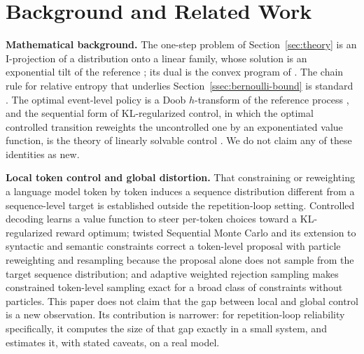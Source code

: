 \documentclass[11pt]{article}
\begin{document}
\section{Background and Related Work}
\label{sec:related}

\textbf{Mathematical background.} The one-step problem of Section~\ref{sec:theory} is an I-projection of a distribution onto a linear family, whose solution is an exponential tilt of the reference \citep{csiszar1975idivergence}; its dual is the convex program of \citet{boyd2004convex}. The chain rule for relative entropy that underlies Section~\ref{ssec:bernoulli-bound} is standard \citep{cover2006elements}. The optimal event-level policy is a Doob $h$-transform of the reference process \citep{doob1957conditional}, and the sequential form of KL-regularized control, in which the optimal controlled transition reweights the uncontrolled one by an exponentiated value function, is the theory of linearly solvable control \citep{kappen2005linear,todorov2007linearly}. We do not claim any of these identities as new.

\textbf{Local token control and global distortion.} That constraining or reweighting a language model token by token induces a sequence distribution different from a sequence-level target is established outside the repetition-loop setting. Controlled decoding \citep{mudgal2024controlled} learns a value function to steer per-token choices toward a KL-regularized reward optimum; twisted Sequential Monte Carlo \citep{zhao2024twisted} and its extension to syntactic and semantic constraints \citep{loula2025syntactic} correct a token-level proposal with particle reweighting and resampling because the proposal alone does not sample from the target sequence distribution; and adaptive weighted rejection sampling \citep{lipkin2025awrs} makes constrained token-level sampling exact for a broad class of constraints without particles. This paper does not claim that the gap between local and global control is a new observation. Its contribution is narrower: for repetition-loop reliability specifically, it computes the size of that gap exactly in a small system, and estimates it, with stated caveats, on a real model.
\end{document}
